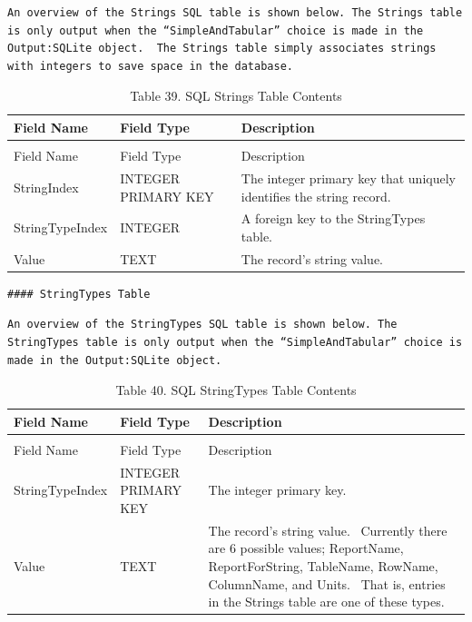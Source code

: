 \begin{lstlisting}
An overview of the Strings SQL table is shown below. The Strings table is only output when the “SimpleAndTabular” choice is made in the Output:SQLite object.  The Strings table simply associates strings with integers to save space in the database.
\end{lstlisting}

\begin{longtable}[c]{p{1.5in}p{1.5in}p{2.99in}}
\caption{Table 39. SQL Strings Table Contents \label{table:table-39.-sql-strings-table-contents}} \tabularnewline
\toprule 
Field Name & Field Type & Description \tabularnewline
\midrule
\endfirsthead

\caption[]{Table 39. SQL Strings Table Contents} \tabularnewline
\toprule 
Field Name & Field Type & Description \tabularnewline
\midrule
\endhead

StringIndex & INTEGER PRIMARY KEY & The integer primary key that uniquely identifies the string record. \tabularnewline
StringTypeIndex & INTEGER & A foreign key to the StringTypes table. \tabularnewline
Value & TEXT & The record’s string value. \tabularnewline
\bottomrule
\end{longtable}

\begin{lstlisting}
#### StringTypes Table
\end{lstlisting}

\begin{lstlisting}
An overview of the StringTypes SQL table is shown below. The StringTypes table is only output when the “SimpleAndTabular” choice is made in the Output:SQLite object.
\end{lstlisting}

\begin{longtable}[c]{p{1.5in}p{1.5in}p{3.0in}}
\caption{Table 40. SQL StringTypes Table Contents \label{table:table-40.-sql-stringtypes-table-contents}} \tabularnewline
\toprule 
Field Name & Field Type & Description \tabularnewline
\midrule
\endfirsthead

\caption[]{Table 40. SQL StringTypes Table Contents} \tabularnewline
\toprule 
Field Name & Field Type & Description \tabularnewline
\midrule
\endhead

StringTypeIndex & INTEGER PRIMARY KEY & The integer primary key. \tabularnewline
Value & TEXT & The record’s string value.~ Currently there are 6 possible values; ReportName, ReportForString, TableName, RowName, ColumnName, and Units.~ That is, entries in the Strings table are one of these types. \tabularnewline
\bottomrule
\end{longtable}

